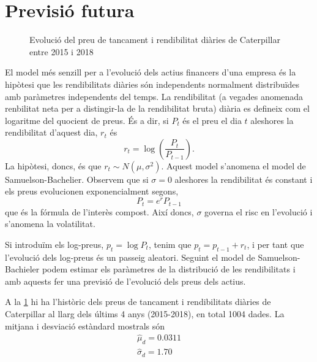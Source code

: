\documentclass{article}
\numberwithin{table}{section}
\numberwithin{figure}{section}
\numberwithin{equation}{section}
\begin{document}
\section{Previsió futura}
\begin{figure}[htb]
	\centering \sffamily \small
	
	\caption{Evolució del preu de tancament i rendibilitat diàries de Caterpillar entre 2015 i 2018}
	\label{fig:serie preus}
\end{figure}
El model més senzill per a l'evolució dels actius financers d'una empresa és la hipòtesi que les rendibilitats diàries són independents normalment distribuïdes amb paràmetres independents del temps. La rendibilitat (a vegades anomenada renbilitat neta per a distingir-la de la rendibilitat bruta) diària es defineix com el logaritme del quocient de preus. És a dir, si \( P_t \) és el preu el dia \( t \) aleshores la rendibilitat d'aquest dia, \( r_t \) és
\begin{equation*}
	r_t = \log{\left(\frac{P_t}{P_{t-1}}\right)}.
\end{equation*}
La hipòtesi, doncs, és que \( r_t \sim N(\mu, \sigma^2) \). Aquest model s'anomena el model de Samuelson-Bachelier. Observem que si \( \sigma = 0 \) aleshores la rendibilitat és constant i els preus evolucionen exponencialment segons,
\begin{equation*}
	P_t = e^{r}P_{t-1}
\end{equation*}
que és la fórmula de l'interès compost. Així doncs, \( \sigma \) governa el risc en l'evolució i s'anomena la volatilitat. 

Si introduïm els log-preus, \( p_t = \log{P_t} \), tenim que \( p_t = p_{t-1} + r_t \), i per tant que l'evolució dels log-preus és un passeig aleatori. Seguint el model de Samuelson-Bachieler podem estimar els paràmetres de la distribució de les rendibilitats i amb aquests fer una previsió de l'evolució dels preus dels actius.  

A la \cref{fig:serie preus} hi ha l'històric dels preus de tancament i rendibilitats diàries de Caterpillar al llarg dels últims 4 anys (2015-2018), en total 1004 dades. La mitjana i desviació estàndard mostrals són
\begin{equation} \label{eq:parametres}
	\begin{gathered}
		\hat{\mu}_d = 0.0311 \\
		\hat{\sigma}_d	= 1.70 \\
	\end{gathered}
\end{equation}
\end{document}
